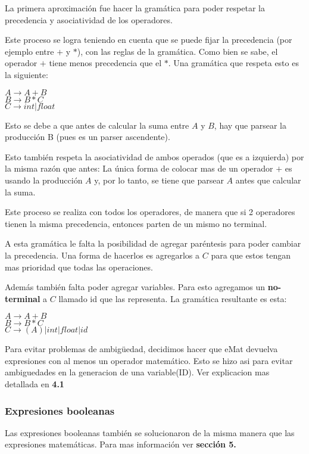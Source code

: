 La primera aproximación fue hacer la gramática para poder respetar la precedencia y asociatividad de los operadores. 

Este proceso se logra teniendo en cuenta que se puede fijar la precedencia (por ejemplo entre $+$ y $*$), con las reglas de la gramática. Como bien se sabe, el operador $+$ tiene menos precedencia que el $*$. Una gramática que respeta esto es la siguiente:

\begin{center}
$A \rightarrow A + B$ \\
$B \rightarrow B * C$ \\
$C \rightarrow int | float$ 
\end{center}
Esto se debe a que antes de calcular la suma entre $A$ y $B$, hay que parsear la producción B (pues es un parser ascendente). 

Esto también respeta la asociatividad de ambos operados (que es a izquierda) por la misma razón que antes: La única forma de colocar mas de un operador $+$ es usando la producción $A$ y, por lo tanto, se tiene que parsear $A$ antes que calcular la suma.

Este proceso se realiza con todos los operadores, de manera que si 2 operadores tienen la misma precedencia, entonces parten de un mismo no terminal.

A esta gramática le falta la posibilidad de agregar paréntesis para poder cambiar la precedencia. Una forma de hacerlos es agregarlos a $C$ para que estos tengan mas prioridad que todas las operaciones.

Además también falta poder agregar variables. Para esto agregamos un \textbf{no-terminal} a $C$ llamado id que las representa. La gramática resultante es esta:
\begin{center}
$A \rightarrow A + B$ \\
$B \rightarrow B * C$ \\
$C \rightarrow (A) | int | float | id$ 
\end{center}

Para evitar problemas de ambigüedad, decidimos hacer que eMat devuelva expresiones con al menos un operador matemático. Esto se hizo asi para evitar ambiguedades en la generacion de una variable(ID). Ver explicacion mas detallada en  \textbf{4.1}

\subsubsection{Expresiones booleanas}
Las expresiones booleanas también se solucionaron de la misma manera que las expresiones matemáticas. Para mas información ver \textbf{sección 5.}

